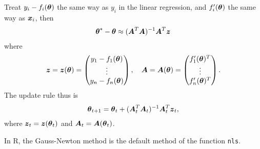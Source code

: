 \begin{frame}
  Treat $y_i - f_i(\boldsymbol{\theta})$ the same way as
  $y_i$ in the linear regression, and $f_i'(\boldsymbol{\theta})$ the same way
  as $\boldsymbol{x}_i$, then
  \begin{align*}
    \boldsymbol{\theta}^* - \boldsymbol{\theta} \approx
    (\boldsymbol{A}\sp{T}\boldsymbol{A})^{-1} \boldsymbol{A}\sp{T} \boldsymbol{z}
  \end{align*}
  where
  \begin{gather*}
    \boldsymbol{z} = \boldsymbol{z}(\boldsymbol{\theta})=
    \begin{pmatrix}
      y_1 - f_1(\boldsymbol{\theta}) \\\vdots\\ y_n - f_n(\boldsymbol{\theta})
    \end{pmatrix},\quad
    \boldsymbol{A} = \boldsymbol{A}(\boldsymbol{\theta}) = \begin{pmatrix}
      f_1'(\boldsymbol{\theta})\sp{T}\\\vdots\\f_n'(\boldsymbol{\theta})\sp{T}
    \end{pmatrix}.
  \end{gather*}
  The update rule thus is
  \begin{align*}
    \boldsymbol{\theta}_{t+1} = \boldsymbol{\theta}_t + (\boldsymbol{A}_t\sp{T}\boldsymbol{A}_t)^{-1}
    \boldsymbol{A}_t\sp{T}\boldsymbol{z}_t,
  \end{align*}
  where $\boldsymbol{z}_t = \boldsymbol{z}(\boldsymbol{\theta}_t)$ and $\boldsymbol{A}_t = \boldsymbol{A}(\boldsymbol{\theta}_t)$.

  In R, the Gauss-Newton method is the default method of the function
  \texttt{nls}.





  \end{frame}






